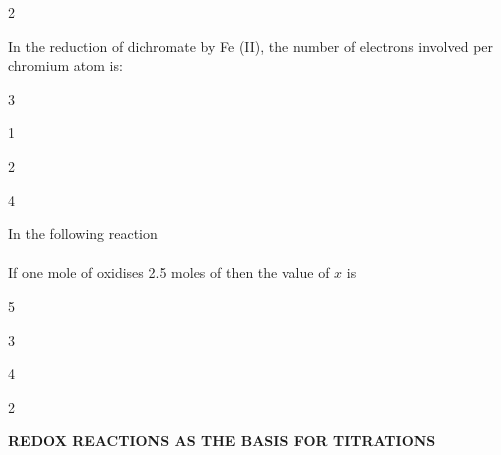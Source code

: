 \documentclass[10pt,a4paper]{article}
\begin{document}
\begin{multicols}{2}
\begin{questions}[start=107]
\item In the reduction of dichromate by Fe (II), the number of electrons involved per chromium atom is:
\begin{options}
  \item 3
  \item 1
  \item 2
  \item 4
\end{options}

\item In the following reaction\\
\\
If one mole of  oxidises 2.5 moles of  then the value of $x$ is
\begin{options}
  \item 5
  \item 3
  \item 4
  \item 2
\end{options}

\end{questions}
\end{multicols}

\begin{mdframed}[backgroundcolor=sectionbg, linewidth=0pt, innerleftmargin=6pt, innerrightmargin=6pt, innertopmargin=4pt, innerbottommargin=4pt]
\color{white}\bfseries\small\centering REDOX REACTIONS AS THE BASIS FOR TITRATIONS
\end{mdframed}
\end{document}
